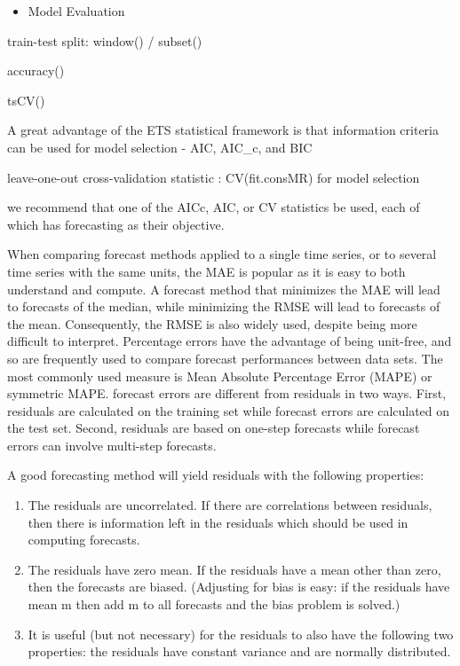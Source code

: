 \documentclass[]{book}
\providecommand{\tightlist}{%
  \setlength{\itemsep}{0pt}\setlength{\parskip}{0pt}}
\begin{document}
\begin{itemize}
\tightlist
\item
  Model Evaluation
\end{itemize}

train-test split: window() / subset()

accuracy()

tsCV()

A great advantage of the ETS statistical framework is that information
criteria can be used for model selection - AIC, AIC\_c, and BIC

leave-one-out cross-validation statistic : CV(fit.consMR) for model
selection

we recommend that one of the AICc, AIC, or CV statistics be used, each
of which has forecasting as their objective.

When comparing forecast methods applied to a single time series, or to
several time series with the same units, the MAE is popular as it is
easy to both understand and compute. A forecast method that minimizes
the MAE will lead to forecasts of the median, while minimizing the RMSE
will lead to forecasts of the mean. Consequently, the RMSE is also
widely used, despite being more difficult to interpret. Percentage
errors have the advantage of being unit-free, and so are frequently used
to compare forecast performances between data sets. The most commonly
used measure is Mean Absolute Percentage Error (MAPE) or symmetric MAPE.
forecast errors are different from residuals in two ways. First,
residuals are calculated on the training set while forecast errors are
calculated on the test set. Second, residuals are based on one-step
forecasts while forecast errors can involve multi-step forecasts.

A good forecasting method will yield residuals with the following
properties:

\begin{enumerate}
\def\labelenumi{\arabic{enumi})}
\item
  The residuals are uncorrelated. If there are correlations between
  residuals, then there is information left in the residuals which
  should be used in computing forecasts.
\item
  The residuals have zero mean. If the residuals have a mean other than
  zero, then the forecasts are biased. (Adjusting for bias is easy: if
  the residuals have mean m then add m to all forecasts and the bias
  problem is solved.)
\item
  It is useful (but not necessary) for the residuals to also have the
  following two properties: the residuals have constant variance and are
  normally distributed.
\end{enumerate}
\end{document}
